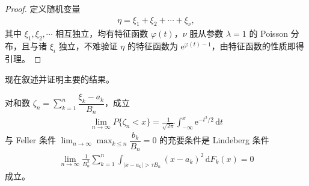 \documentclass[../../main.tex]{subfiles}
\begin{document}
\begin{proof}
定义随机变量
\begin{align*}
\eta=\xi_1+\xi_2+\cdots+\xi_{\nu},
\end{align*}
其中 $\xi_1,\xi_2,\cdots$ 相互独立，均有特征函数 $\varphi(t)$，$\nu$ 服从参数 $\lambda=1$ 的 Poisson 分布，且与诸 $\xi_i$ 独立，不难验证 $\eta$ 的特征函数为 $\mathrm{e}^{\varphi(t)-1}$，由特征函数的性质即得引理。
\end{proof}

现在叙述并证明主要的结果。

\begin{theorem}\label{theorem:ch05-LindebergFeller}
对和数 $\zeta_n=\sum_{k=1}^{n}\dfrac{\xi_k-a_k}{B_n}$，成立
\begin{align}
\lim_{n\to\infty}P\{\zeta_n<x\}=\frac{1}{\sqrt{2\pi}}\int_{-\infty}^{x}\mathrm{e}^{-t^{2}/2}\,\mathrm{d}t
\end{align}
与 Feller 条件 $\lim_{n\to\infty}\max_{k\leqslant n}\dfrac{b_k}{B_n}=0$ 的充要条件是 Lindeberg 条件
\begin{align*}
\lim_{n\to\infty}\frac{1}{B_n^{2}}\sum_{k=1}^{n}\int_{|x-a_k|>\tau B_n}(x-a_k)^{2}\,\mathrm{d}F_k(x)=0
\end{align*}
成立。
\end{theorem}
\end{document}
